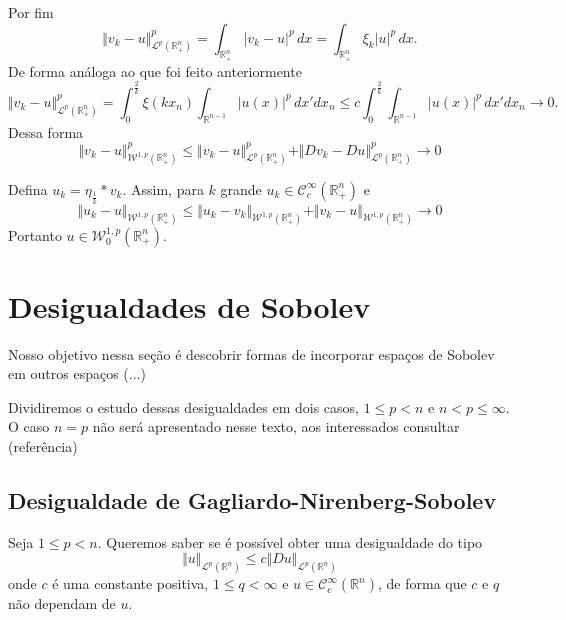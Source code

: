 \documentclass[a4paper, 11pt]{book}
\theoremstyle{definition}
\newcommand{\bR}{\mathbb{R}}
\newcommand{\cC}{\mathcal{C}}
\newcommand{\cL}{\mathcal{L}}
\newcommand{\cW}{\mathcal{W}}
\begin{document}
\begin{prf}
    Por fim
    \[
        \Vert v_k - u \Vert_{\cL^p(\bR^n_+)}^p = \int_{\bR^n_+} |v_k - u|^p \,dx = \int_{\bR^n_+} \xi_k|u|^p \,dx.
    \]
    De forma análoga ao que foi feito anteriormente
    \[
        \Vert v_k - u \Vert_{\cL^p(\bR^n_+)}^p = \int_{0}^{\frac{2}{k}} \xi(kx_n) \int_{\bR^{n-1}} |u(x)|^p \,dx'dx_n \leqslant c \int_{0}^{\frac{2}{k}} \int_{\bR^{n-1}} |u(x)|^p \, dx'dx_n \to 0.
    \]
    Dessa forma
    \[
        \Vert v_k - u \Vert_{\cW^{1,p}(\bR^n_+)}^p \leqslant \Vert v_k - u \Vert_{\cL^{p}(\bR^n_+)}^p + \Vert Dv_k - Du \Vert_{\cL^{p}(\bR^n_+)}^p \to 0
    \]

    Defina $u_k = \eta_{\frac{1}{k}} * v_k$. Assim, para $k$ grande $u_k \in \cC^{\infty}_c(\bR^n_+)$ e 
    \[
        \Vert u_k - u \Vert_{\cW^{1,p}(\bR^n_+)} \leqslant \Vert u_k - v_k \Vert_{\cW^{1,p}(\bR^n_+)} + \Vert v_k - u \Vert_{\cW^{1,p}(\bR^n_+)} \to 0
    \]
    Portanto $u \in \cW^{1,p}_0(\bR^n_+)$.
\end{prf}

\section{Desigualdades de Sobolev}

Nosso objetivo nessa seção é descobrir formas de incorporar espaços de Sobolev em outros espaços (...)

Dividiremos o estudo dessas desigualdades em dois casos, $1 \leqslant p < n$ e $n < p \leqslant \infty$.
O caso $n = p$ não será apresentado nesse texto, aos interessados consultar (referência)

\subsection{Desigualdade de Gagliardo-Nirenberg-Sobolev}

Seja $1 \leqslant p < n$.
Queremos saber se é possível obter uma desigualdade do tipo
\begin{equation} \label{eq:quase-gns}
    \Vert u \Vert_{\cL^p(\bR^n)} \leqslant c \Vert Du \Vert_{\cL^p(\bR^n)}
\end{equation}
onde $c$ é uma constante positiva, $1 \leqslant q < \infty$ e $u \in \cC^\infty_c(\bR^n)$, de forma que $c$ e $q$ não dependam de $u$.
\end{document}
